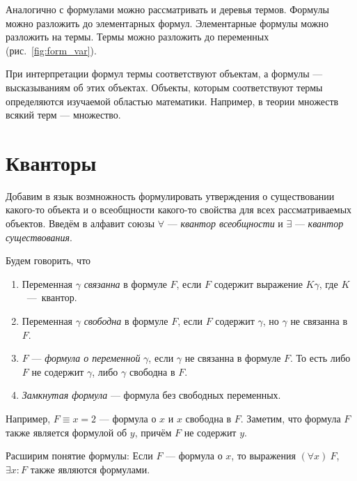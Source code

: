 Аналогично с формулами можно рассматривать и деревья термов.
Формулы можно разложить до элементарных формул. Элементарные формулы
можно разложить на термы. Термы можно разложить до переменных (рис.~\ref{fig:form_var}).

При интерпретации формул термы соответствуют объектам, а формулы --- высказываниям
об этих объектах. Объекты, которым соответствуют термы определяются изучаемой
областью математики. Например, в теории множеств всякий терм --- множество.

\section{Кванторы}

Добавим в язык возмножность формулировать утверждения о существовании
какого-то объекта и о всеобщности какого-то свойства для всех рассматриваемых объектов.
Введём в алфавит союзы $\forall$
--- {\it квантор всеобщности} и $\exists$
--- {\it квантор существования}.

\pagebreak
Будем говорить, что
\begin{enumerate}
  \item{}Переменная $\gamma$ {\it связанна}
  в формуле $F$, если $F$ содержит
  выражение $K\gamma$, где $K$~---~квантор.

  \item{}Переменная $\gamma$ {\it свободна}
  в формуле $F$, если $F$ содержит $\gamma$,
  но $\gamma$ не связанна в $F$.

  \item{}$F$ --- {\it формула о переменной} $\gamma$, если $\gamma$
  не связанна в формуле $F$.
  То есть либо $F$ не содержит $\gamma$, либо $\gamma$ свободна в $F$.

  \item{}{\it Замкнутая формула} --- формула без свободных переменных.
\end{enumerate}

Например, $F\equiv x=2$ --- формула о $x$ и $x$ свободна в $F$.
Заметим, что формула $F$ также является формулой об $y$, причём $F$ не содержит $y$.

Расширим понятие формулы:
Если $F$ --- формула о $x$, то выражения $(\forall x)~F$, $\exists x:F$
также являются формулами.

